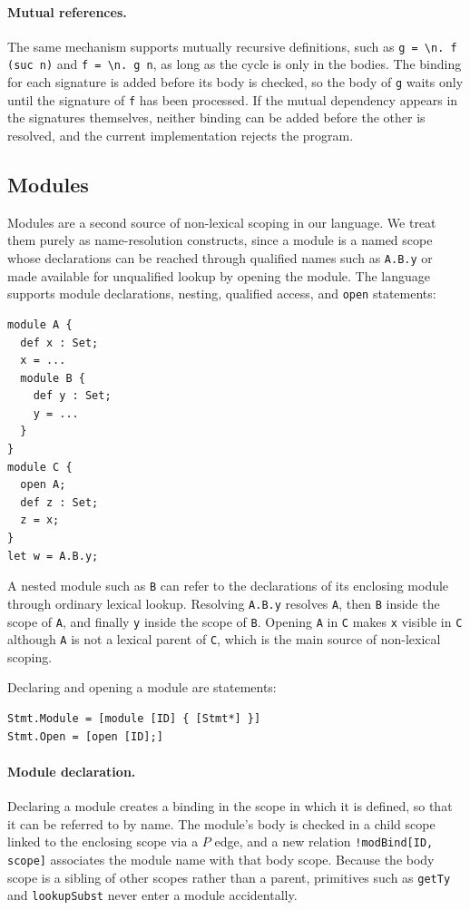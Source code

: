 \paragraph{Mutual references.} The same mechanism supports mutually recursive
definitions, such as \texttt{g = \textbackslash n. f (suc n)} and
\texttt{f = \textbackslash n. g n}, as long as the cycle is only in the bodies.
The binding for each signature is added before its body is checked, so the body
of \texttt{g} waits only until the signature of \texttt{f} has been processed.
If the mutual dependency appears in the signatures themselves, neither binding
can be added before the other is resolved, and the current implementation
rejects the program.

\subsection{Modules}

Modules are a second source of non-lexical scoping in our language. We treat
them purely as name-resolution constructs, since a module is a named scope whose
declarations can be reached through qualified names such as \texttt{A.B.y} or
made available for unqualified lookup by opening the module. The language
supports module declarations, nesting, qualified access, and \texttt{open}
statements:

\begin{lstlisting}
module A {
  def x : Set;
  x = ...
  module B {
    def y : Set;
    y = ...
  }
}
module C {
  open A;
  def z : Set;
  z = x;
}
let w = A.B.y;
\end{lstlisting}

\noindent A nested module such as \texttt{B} can refer to the declarations of
its enclosing module through ordinary lexical lookup. Resolving \texttt{A.B.y}
resolves \texttt{A}, then \texttt{B} inside the scope of \texttt{A}, and finally
\texttt{y} inside the scope of \texttt{B}. Opening \texttt{A} in \texttt{C}
makes \texttt{x} visible in \texttt{C} although \texttt{A} is not a lexical
parent of \texttt{C}, which is the main source of non-lexical scoping.

Declaring and opening a module are statements:

\begin{lstlisting}[language=SDF3, caption=Syntax for module statements]
Stmt.Module = [module [ID] { [Stmt*] }]
Stmt.Open = [open [ID];]
\end{lstlisting} 
\paragraph{Module declaration.} Declaring a module creates a binding in the scope
in which it is defined, so that it can be referred to by name. The module's body
is checked in a child scope linked to the enclosing scope via a $P$ edge, and a
new relation \texttt{!modBind[ID, scope]} associates the module name with that
body scope. Because the body scope is a sibling of other scopes rather than a
parent, primitives such as \texttt{getTy} and \texttt{lookupSubst} never enter
a module accidentally.

